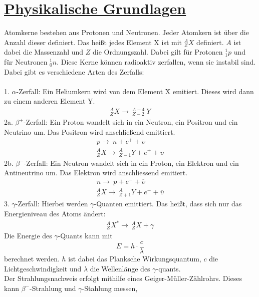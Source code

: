 \documentclass[11pt,a4paper]{article}
\begin{document}
 \section{\underline{Physikalische Grundlagen}}
  Atomkerne bestehen aus Protonen und Neutronen. Jeder Atomkern ist \"uber die
  Anzahl dieser definiert. Das hei{\ss}t jedes Element X ist mit $^{A}_{Z}{X}$ definiert.
  $A$ ist dabei die Massenzahl und $Z$ die Ordnungszahl. Dabei gilt f\"ur Protonen $^{1}_{1}{p}$
  und f\"ur Neutronen $^{1}_{0}{n}$. Diese Kerne k\"onnen radioaktiv zerfallen, wenn sie 
  instabil sind. Dabei gibt es verschiedene Arten des Zerfalls: \\\\
  1. $\alpha$-Zerfall: Ein Heliumkern wird von dem Element X emitiert. Dieses wird dann zu einem anderen Element Y.
   \begin{align}
    ^{A}_{Z}{X} \rightarrow~^{A-4}_{Z-2}~{Y}
   \end{align}
  2a. ${\beta}^{+}$-Zerfall: Ein Proton wandelt sich in ein Neutron, ein Positron und ein Neutrino um.
  Das Positron wird anschlie{\ss}end emittiert.
   \begin{align}
    p \rightarrow~n + {e}^{+} + \upsilon \\
    ^{A}_{Z}{X} \rightarrow~^{A}_{Z-1}{Y} + {e}^{+} + \upsilon
   \end{align}
  2b. ${\beta}^{-}$-Zerfall: Ein Neutron wandelt sich in ein Proton, ein Elektron und ein Antineutrino
  um. Das Elektron wird anschliessend emitiert.
   \begin{align}
    n \rightarrow~p + {e}^{-} + \overline{\upsilon} \\ 
    ^{A}_{Z}{X} \rightarrow~^{A}_{Z+1}{Y} + {e}^{-} + \overline{\upsilon}
   \end{align}
  3. $\gamma$-Zerfall: Hierbei werden $\gamma$-Quanten emittiert. Das hei{\ss}t, dass sich nur das
  Energieniveau des Atoms \"andert:
   \begin{align}
    ^{A}_{Z}{X}^{*} \rightarrow ~ ^{A}_{Z}{X} + \gamma
   \end{align}
  Die Energie des $\gamma$-Quants kann mit 
   \begin{equation}
    E = h \cdot \frac{c}{\lambda}
   \end{equation}
  berechnet werden. 
  $h$ ist dabei das Planksche Wirkungsquantum, $c$ die Lichtgeschwindigkeit und $\lambda$ die Wellenl\"ange des $\gamma$-quants.\\
  Der Strahlungsnachweis erfolgt mithilfe eines Geiger-M\"uller-Z\"ahlrohrs. Dieses kann ${\beta}^{-}$-Strahlung und $\gamma$-Stahlung messen,
\end{document}
